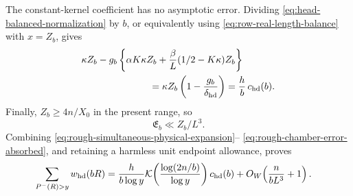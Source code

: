 \documentclass[11pt]{article}
\numberwithin{equation}{section}
\theoremstyle{definition}
\theoremstyle{remark}
\newcommand{\1}{\mathbf 1}
\begin{document}
The constant-kernel coefficient has no asymptotic error.  Dividing
\eqref{eq:head-balanced-normalization} by \(b\), or equivalently using
\eqref{eq:row-real-length-balance} with \(x=Z_b\), gives
\begin{align}
 &\kappa Z_b-g_b\left\{\alpha K\kappa Z_b
       +\frac\beta L(1/2-K\kappa)Z_b\right\}\notag\\
 &\hspace{25mm}=\kappa Z_b\left(1-\frac{g_b}{\delta_{\rm hd}}\right)
 =\frac hb\,c_{\rm hd}(b).
 \label{eq:rough-exact-physical-coefficient}
\end{align}
Finally, \(Z_b\ge4n/X_0\) in the present range, so
\begin{equation}
 \mathfrak E_b\ll Z_b/L^3.
 \label{eq:rough-chamber-error-absorbed}
\end{equation}
Combining
\eqref{eq:rough-simultaneous-physical-expansion}--
\eqref{eq:rough-chamber-error-absorbed}, and retaining a harmless unit
endpoint allowance, proves
\begin{align}
 \sum_{P^-(R)>y}w_{\rm hd}(bR)
 &=\frac{h}{b\log y}
   \mathcal K\!\left(\frac{\log(2n/b)}{\log y}\right)c_{\rm hd}(b)
   +O_W\!\left(\frac{n}{bL^3}+1\right).
 \label{eq:exceptional-deep-core}
\end{align}
\end{document}
